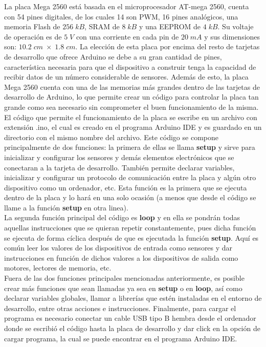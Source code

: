 \documentclass[12pt]{article}
\begin{document}
La placa Mega 2560 está basada en el microprocesador AT-mega 2560, cuenta con 54 pines digitales, de los cuales 14 son PWM, 16 pines analógicos, una memoria Flash de $256 \; kB$, SRAM de $8 \; kB$ y una EEPROM de $4 \; kB$. Su voltaje de operación es de $5 \; V$ con una corriente en cada pin de $20 \; mA$ y sus dimensiones son: $10.2 \; cm \; \times \; 1.8 \; cm$. La elección de esta placa por encima del resto de tarjetas de desarrollo que ofrece Arduino se debe a su gran cantidad de pines, característica necesaria para que el dispositivo a construir tenga la capacidad de recibir datos de un número considerable de sensores. Además de esto, la placa Mega 2560 cuenta con una de las memorias más grandes dentro de las tarjetas de desarrollo de Arduino, lo que permite crear un código para controlar la placa tan grande como sea necesario sin comprometer el buen funcionamiento de la misma. \\

El código que permite el funcionamiento de la placa se escribe en un archivo con extensión .ino, el cual es creado en el programa Arduino IDE y es guardado en un directorio con el mismo nombre del archivo. Este código se compone principalmente de dos funciones: la primera de ellas se llama \textbf{setup} y sirve para inicializar y configurar los sensores y demás elementos electrónicos que se conectaran a la tarjeta de desarrollo. También permite declarar variables, inicializar y configurar un protocolo de comunicación entre la placa y algún otro dispositivo como un ordenador, etc. Esta función es la primera que se ejecuta dentro de la placa y lo hará en una solo ocasión (a menos que desde el código se llame a la función \textbf{setup} en otra linea). \\

La segunda función principal del código es \textbf{loop} y en ella se pondrán todas aquellas instrucciones que se quieran repetir constantemente, pues dicha función se ejecuta de forma cíclica después de que es ejecutada la función \textbf{setup}. Aquí es común leer los valores de los dispositivos de entrada como sensores y dar instrucciones en función de dichos valores a los dispositivos de salida como motores, lectores de memoria, etc. \\

Fuera de las dos funciones principales mencionadas anteriormente, es posible crear más funciones que sean llamadas ya sea en \textbf{setup} o en \textbf{loop}, así como declarar variables globales, llamar a librerías que estén instaladas en el entorno de desarrollo, entre otras acciones e instrucciones. Finalmente, para cargar el programa es necesario conectar un cable USB tipo B hembra desde el ordenador donde se escribió el código hasta la placa de desarrollo y dar click en la opción de cargar programa, la cual se puede encontrar en el programa Arduino IDE. \\
\end{document}
